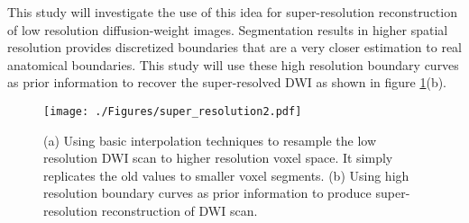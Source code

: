 \noindent This study will investigate the use of this idea for super-resolution reconstruction of low resolution diffusion-weight images. Segmentation results in higher spatial resolution provides discretized boundaries that are a very closer estimation to real anatomical boundaries. This study will use these high resolution boundary curves as prior information to recover the super-resolved DWI as shown in figure \ref{fig:super_resolution2}(b).

\begin{figure}[ht!]
    \begin{center}
      \texttt{[image: ./Figures/super\_resolution2.pdf]}
    \end{center}
    \vspace{-15pt}
    \caption{(a) Using basic interpolation techniques to resample the low resolution DWI scan to higher resolution voxel space. It simply replicates the old values to smaller voxel segments. (b) Using high resolution boundary curves as prior information to produce super-resolution reconstruction of DWI scan.}
    \vspace{-5pt}
    \label{fig:super_resolution2}
\end{figure}
